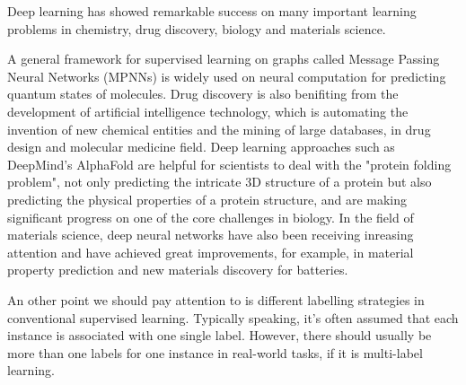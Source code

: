 \documentclass[10pt,twocolumn,letterpaper]{article}
\begin{document}
Deep learning has showed remarkable success on many important learning problems in chemistry, drug discovery, biology and materials science.

A general framework for supervised learning on graphs called Message Passing Neural Networks (MPNNs) is widely used on neural computation for predicting quantum states of molecules.
Drug discovery is also benifiting from the development of artificial intelligence technology, which is automating the invention of new chemical entities and the mining of large databases, in drug design and molecular medicine field.  
Deep learning approaches such as DeepMind's AlphaFold are helpful for scientists to deal with the "protein folding problem", not only predicting the intricate 3D structure of a protein but also predicting the physical properties of a protein structure, and are making significant progress on one of the core challenges in biology.
In the field of materials science, deep neural networks have also been receiving inreasing attention and have achieved great improvements, for example, in material property prediction and new materials discovery for batteries.

An other point we should pay attention to is different labelling strategies in conventional supervised learning.
Typically speaking, it's often assumed that each instance is associated with one single label. However, there should usually be more than one labels for one instance in real-world tasks, if it is multi-label learning.





\end{document}
